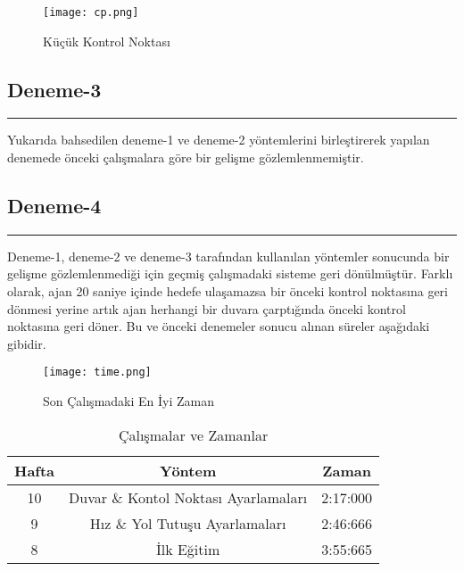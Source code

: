\documentclass{article}
\begin{document}
\begin{figure}[h]
    \begin{center}
        \texttt{[image: cp.png]}
    \end{center}
      \caption{Küçük Kontrol Noktası}
\end{figure}

\vspace{1cm}

\subsection{Deneme-3}
\rule{\textwidth}{0.5pt}
\par Yukarıda bahsedilen deneme-1 ve deneme-2 yöntemlerini birleştirerek yapılan denemede önceki çalışmalara göre bir gelişme gözlemlenmemiştir.\\[5pt]

\subsection{Deneme-4}
\rule{\textwidth}{0.5pt}
\par Deneme-1, deneme-2 ve deneme-3 tarafından kullanılan yöntemler sonucunda bir gelişme gözlemlenmediği için geçmiş çalışmadaki sisteme geri dönülmüştür. Farklı olarak, ajan 20 saniye içinde hedefe ulaşamazsa bir önceki kontrol noktasına geri dönmesi yerine artık ajan herhangi bir duvara çarptığında önceki kontrol noktasına geri döner. Bu ve önceki denemeler sonucu alınan süreler aşağıdaki gibidir.\\[5pt]

\begin{figure}[h]
    \begin{center}
        \texttt{[image: time.png]}
    \end{center}
      \caption{Son Çalışmadaki En İyi Zaman}
\end{figure}

\vspace{1.5cm}

\captionsetup[table]{justification=raggedright, singlelinecheck=false}

\renewcommand{\tablename}{Tablo}
\begin{table}[h!]
\centering
  \Large %
    \caption {Çalışmalar ve Zamanlar}
  \begin{tabular}{|c|c|c|}
    \hline
    Hafta & Yöntem & Zaman \\
    \hline
    10 & Duvar \& Kontol Noktası Ayarlamaları & 2:17:000 \\
    \hline
    9 & Hız \& Yol Tutuşu Ayarlamaları & 2:46:666 \\
    \hline
    8 & İlk Eğitim & 3:55:665 \\
    \hline
  \end{tabular}
\end{table}
\end{document}
